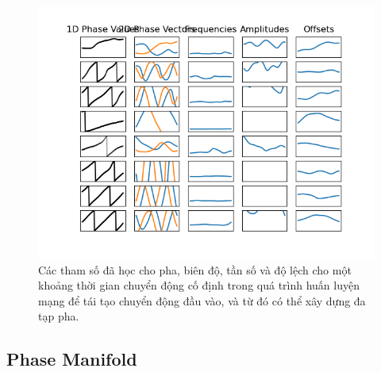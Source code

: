 \begin{figure}
	\centering
	\includegraphics[width=\linewidth]{images/phase_bias_frequency_amplitudes_offsets.png}
	\caption{Các tham số đã học cho pha, biên độ, tần số và độ lệch cho một khoảng thời gian chuyển động cố định trong quá trình huấn luyện mạng để tái tạo chuyển động đầu vào, và từ đó có thể xây dựng đa tạp pha.}
	\label{fig:phase_bias_frequency_amplitudes_offsets}
\end{figure}



\subsection{Phase Manifold}
\label{sec:summary_diffusion}



